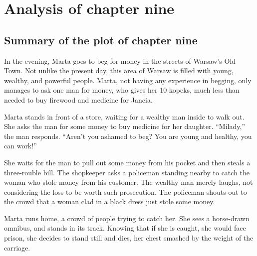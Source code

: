 \section{Analysis of chapter nine}

\subsection{Summary of the plot of chapter nine}

In the evening, Marta goes to beg for money in the streets of Warsaw's Old Town.
Not unlike the present day, this area of Warsaw is filled with young, wealthy, and powerful people.
Marta, not having any experience in begging, only manages to ask one man for money, who gives her 10 kopeks, much less than needed to buy firewood and medicine for Jancia.

Marta stands in front of a store, waiting for a wealthy man inside to walk out.
She asks the man for some money to buy medicine for her daughter.
``Milady,'' the man responds. ``Aren't you ashamed to beg? You are young and healthy, you can work!''

She waits for the man to pull out some money from his pocket and then steals a three-rouble bill.
The shopkeeper asks a policeman standing nearby to catch the woman who stole money from his customer.
The wealthy man merely laughs, not considering the loss to be worth such prosecution.
The policeman shouts out to the crowd that a woman clad in a black dress just stole some money.

Marta runs home, a crowd of people trying to catch her.
She sees a horse-drawn omnibus, and stands in its track.
Knowing that if she is caught, she would face prison, she decides to stand still and dies, her chest smashed by the weight of the carriage.
